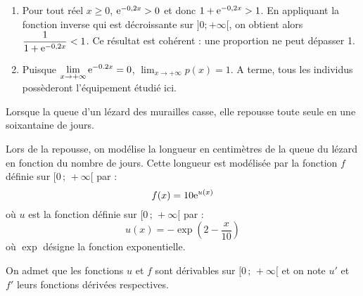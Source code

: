 \documentclass[11pt,fleqn, openany]{book} %
\begin{document}
\begin{solution}
\begin{enumerate}
\begin{enumerate}
\item Pour tout réel $x\geqslant 0$, $\mathrm{e}^{-0,2x} > 0$ et donc $1+\mathrm{e}^{-0,2x} > 1$. En appliquant la fonction inverse qui est décroissante sur $]0;+\infty[$, on obtient alors $\dfrac{1}{1+\mathrm{e}^{-0,2x}} < 1$. Ce résultat est cohérent : une proportion ne peut dépasser 1.

\item Puisque $\displaystyle\lim_{x\to+\infty}\mathrm{e}^{-0.2x}=0$, $\displaystyle\lim_{x\to+\infty}p(x)=1$. A terme, tous les individus possèderont l'équipement étudié ici.
\end{enumerate}\end{enumerate}
\end{solution}





\begin{exercise}[topic=lim24, subtitle={(Amérique du Sud 2018)}]\hspace{0pt}
Lorsque la queue d'un lézard des murailles casse, elle repousse toute seule en une soixantaine de
jours.

Lors de la repousse, on modélise la longueur en centimètres de la queue du lézard en fonction du
nombre de jours. Cette longueur est modélisée par la fonction $f$ définie sur $[0\,;\,+\infty [$ par :
\[f(x)=10 \mathrm{e}^{u(x)}\]
où $u$ est la fonction définie sur $[0\,;\,+\infty [$ par :
\[u(x)=-\exp\left(2-\dfrac{x}{10}\right)\]
où $\exp$ désigne la fonction exponentielle.

On admet que les fonctions $u$ et $f$ sont dérivables sur $[0\,;\,+\infty [$ et on note $u'$ et $f'$ leurs fonctions dérivées respectives.


\end{exercise}
\end{document}

